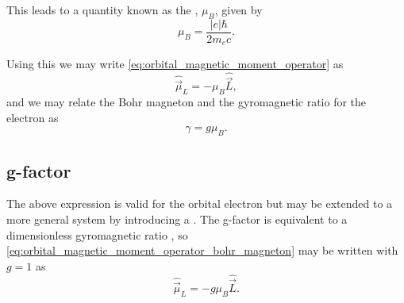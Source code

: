 This leads to a quantity known as the \textbf{}, $\mu_B$, given by \cite{Ramamurti1995-wg}
\begin{equation}
	\mu_B = \frac{|e|\hbar}{2m_e c}.
	\label{eq:bohr_magneton}
\end{equation}

Using this we may write \eqref{eq:orbital_magnetic_moment_operator} as
\begin{equation}
	\hat{\vec{\mu}}_L = -\mu_B\hat{\vec{L}},
	\label{eq:orbital_magnetic_moment_operator_bohr_magneton}
\end{equation}
{\color{edired}
and we may relate the Bohr magneton and the gyromagnetic ratio for the electron as 
\begin{equation}
    \gamma = g\mu_B.
    \label{eq:}
\end{equation}
}


\subsection{g-factor}
The above expression is valid for the orbital electron but may be extended to a more general system by introducing a . The g-factor is equivalent to a dimensionless gyromagnetic ratio \cite{giancoli2008physics}, so \eqref{eq:orbital_magnetic_moment_operator_bohr_magneton} may be written with $g=1$ as
\begin{equation}
	\hat{\vec{\mu}}_L = -g\mu_B\hat{ \vec{L}}.
	\label{eq:orbital_magnetic_moment_operator_bohr_magneton_g_factor}
\end{equation}

